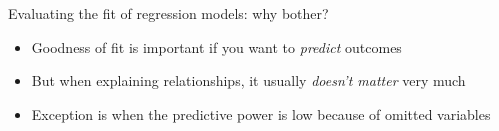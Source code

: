 \begin{frame}{Evaluating the fit of regression models: why bother?}
  \begin{itemize}
    \item Goodness of fit is important if you want to \emph{predict} outcomes
    \item But when explaining relationships, it usually \emph{doesn't matter} very much
    \item Exception is when the predictive power is low because of omitted variables
  \end{itemize}
\end{frame}
